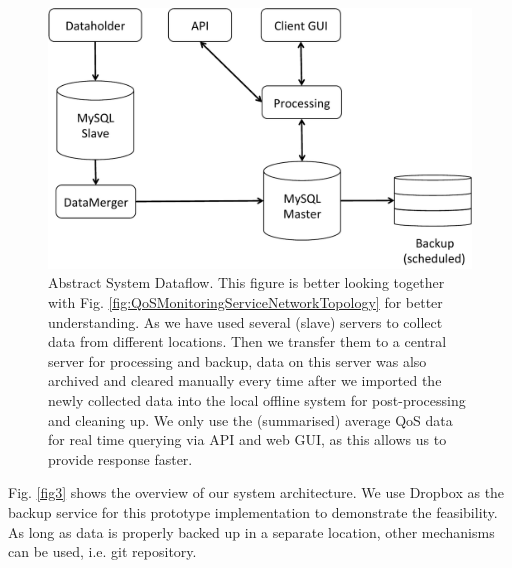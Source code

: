 \begin{figure}[!ht]
 \centering
 \includegraphics[width=\textwidth,keepaspectratio]{Figures/QoS/figure1.pdf}
 \caption{Abstract System Dataflow. This figure is better looking together with Fig. \ref{fig:QoSMonitoringServiceNetworkTopology} for better understanding. As we have used several (slave) servers to collect data from different locations. Then we transfer them to a central server for processing and backup, data on this server was also archived and cleared manually every time after we imported the newly collected data into the local offline system for post-processing and cleaning up. We only use the (summarised) average QoS data for real time querying via API and web GUI, as this allows us to provide response faster.}
\label{fig1}
\end{figure}

Fig. \ref{fig3} shows the overview of our system architecture. We use Dropbox as the backup service for this prototype implementation to demonstrate the feasibility. As long as data is properly backed up in a separate location, other mechanisms can be used, i.e. git repository.

